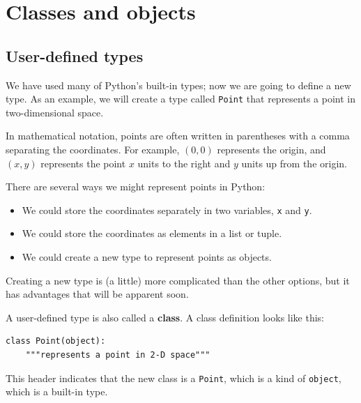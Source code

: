 \documentclass[10pt]{book}
\begin{document}
\chapter{Classes and objects}


\section{User-defined types}
\label{point}


We have used many of Python's built-in types; now we are going
to define a new type.  As an example, we will create a type
called {\tt Point} that represents a point in two-dimensional
space.


In mathematical notation, points are often written in
parentheses with a comma separating the coordinates. For example,
$(0, 0)$ represents the origin, and $(x, y)$ represents the
point $x$ units to the right and $y$ units up from the origin.

There are several ways we might represent points in Python:

\begin{itemize}

\item We could store the coordinates separately in two
variables, {\tt x} and {\tt y}.

\item We could store the coordinates as elements in a list
or tuple.

\item We could create a new type to represent points as
objects.

\end{itemize}


Creating a new type
is (a little) more complicated than the other options, but
it has advantages that will be apparent soon.

A user-defined type is also called a {\bf class}.
A class definition looks like this:


\beforeverb
\begin{verbatim}
class Point(object):
    """represents a point in 2-D space"""
\end{verbatim}
\afterverb
%
This header indicates that the new class is a {\tt Point},
which is a kind of {\tt object}, which is a built-in
type.
\end{document}
